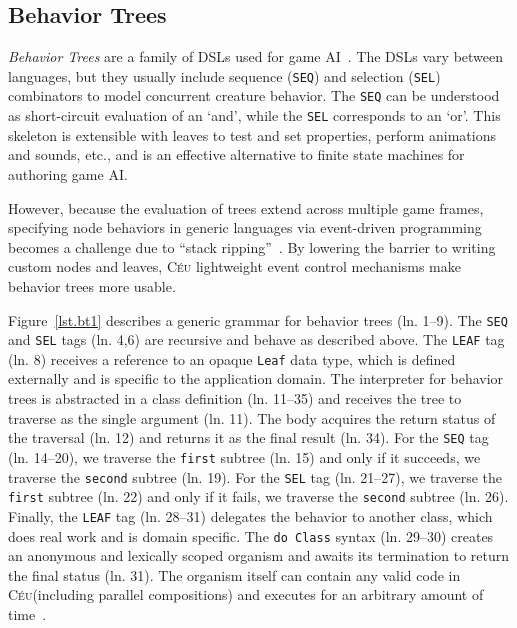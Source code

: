 \documentclass{sig-alternate}
\newcommand{\CEU}{\textsc{C\'{e}u}\xspace}
\newcommand{\code}[1] {{\small{\texttt{#1}}}}
\begin{document}
\subsection{Behavior Trees}
\label{subsec.bt}

\emph{Behavior Trees} are a family of DSLs used for game 
AI~\cite{isla2005,hecker2009my}.
The DSLs vary between languages, but they usually include sequence (\code{SEQ}) 
and selection (\code{SEL}) combinators to model concurrent creature behavior.
%
The \code{SEQ} can be understood as short-circuit evaluation of an `and',
while the \code{SEL} corresponds to an `or'.
%
This skeleton is extensible with leaves to test and set properties, perform 
animations and sounds, etc., and is an effective alternative to finite state 
machines for authoring game AI.

However, because the evaluation of trees extend across multiple game frames, 
specifying node behaviors in generic languages via event-driven programming 
becomes a challenge due to ``stack ripping''~\cite{krohn2007events}.
%
%
By lowering the barrier to writing custom nodes and leaves, \CEU lightweight 
event control mechanisms make behavior trees more usable.

Figure~\ref{lst.bt1} describes a generic grammar for behavior trees (ln. 
1--9).
The \code{SEQ} and \code{SEL} tags (ln. 4,6) are recursive and behave as 
described above.
%
The \code{LEAF} tag (ln. 8) receives a reference to an opaque \code{Leaf} data 
type, which is defined externally and is specific to the application domain.
%
The interpreter for behavior trees is abstracted in a class definition (ln.  
11--35) and receives the tree to traverse as the single argument (ln. 11).
The body acquires the return status of the traversal (ln. 12) and returns it as 
the final result (ln. 34).
%
%
For the \code{SEQ} tag (ln. 14--20), we traverse the \code{first} subtree 
(ln. 15) and only if it succeeds, we traverse the \code{second} subtree (ln.  
19).
%
For the \code{SEL} tag (ln. 21--27), we traverse the \code{first} subtree 
(ln. 22) and only if it fails, we traverse the \code{second} subtree (ln. 
26).
%
Finally, the \code{LEAF} tag (ln. 28--31) delegates the behavior to another 
class, which does real work and is domain specific.
The \code{do Class} syntax (ln. 29--30) creates an anonymous and lexically 
scoped organism and awaits its termination to return the final status (ln.  
31).
The organism itself can contain any valid code in \CEU (including parallel 
compositions) and executes for an arbitrary amount of time~\cite{ceu.mod15}.
\end{document}
